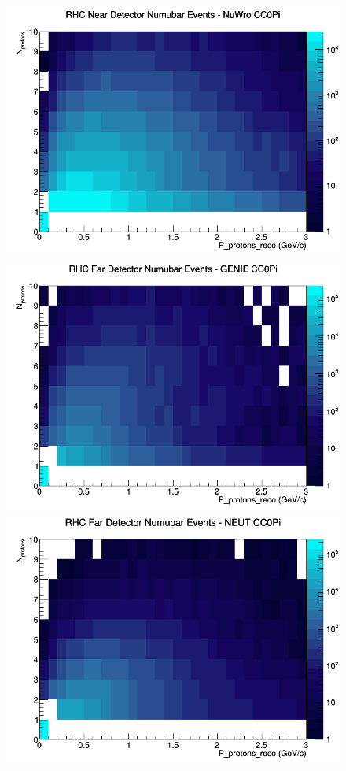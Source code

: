 \documentclass[12pt]{article}
\begin{document}
\begin{figure}[h]
\includegraphics[width=\linewidth]{eff_N_P/GAr/protons/CC0Pi_RHC_ND_numubar_N_P_NuWro.png}
\endminipage
\newline
{}
\includegraphics[width=\linewidth]{eff_N_P/GAr/protons/CC0Pi_RHC_FD_numubar_N_P_GENIE.png}
\endminipage
{}
\includegraphics[width=\linewidth]{eff_N_P/GAr/protons/CC0Pi_RHC_FD_numubar_N_P_NEUT.png}

\end{figure}
\end{document}
